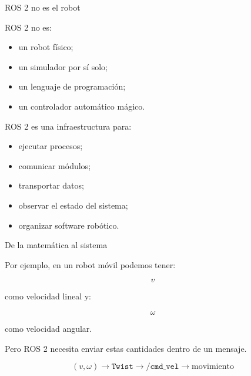 \documentclass[aspectratio=169]{beamer}
\begin{document}
\begin{frame}{ROS 2 no es el robot}

    ROS 2 no es:

    \begin{itemize}
        \item un robot físico;
        \item un simulador por sí solo;
        \item un lenguaje de programación;
        \item un controlador automático mágico.
    \end{itemize}

    \vspace{0.3cm}

    ROS 2 es una infraestructura para:

    \begin{itemize}
        \item ejecutar procesos;
        \item comunicar módulos;
        \item transportar datos;
        \item observar el estado del sistema;
        \item organizar software robótico.
    \end{itemize}

\end{frame}

\begin{frame}{De la matemática al sistema}

    Por ejemplo, en un robot móvil podemos tener:

    \[
    v
    \]

    como velocidad lineal y:

    \[
    \omega
    \]

    como velocidad angular.

    Pero ROS 2 necesita enviar estas cantidades dentro de un mensaje.

    \vspace{0.3cm}

    \[
    (v,\omega)
    \rightarrow
    \texttt{Twist}
    \rightarrow
    \texttt{/cmd\_vel}
    \rightarrow
    \text{movimiento}
    \]

    \vspace{0.3cm}


\end{frame}
\end{document}
